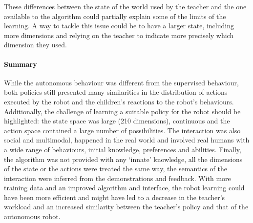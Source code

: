 These differences between the state of the world used by the teacher and the one available to the algorithm could partially explain some of the limits of the learning. A way to tackle this issue could be to have a larger state, including more dimensions and relying on the teacher to indicate more precisely which dimension they used. 

\paragraph{Summary}
While the autonomous behaviour was different from the supervised behaviour, both policies still presented many similarities in the distribution of actions executed by the robot and the children's reactions to the robot's behaviours. Additionally, the challenge of learning a suitable policy for the robot should be highlighted: the state space was large (210 dimensions), continuous and the action space contained a large number of possibilities. The interaction was also social and multimodal, happened in the real world and involved real humans with a wide range of behaviours, initial knowledge, preferences and abilities. Finally, the algorithm was not provided with any `innate' knowledge, all the dimensions of the state or the actions were treated the same way, the semantics of the interaction were inferred from the demonstrations and feedback. With more training data and an improved algorithm and interface, the robot learning could have been more efficient and might have led to a decrease in the teacher's workload and an increased similarity between the teacher's policy and that of the autonomous robot. 

